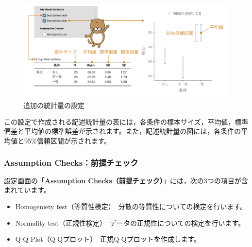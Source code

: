 \documentclass[
  12pt,
  a5jpaper,
  lualatex, ja=standard]{bxjsbook}
\providecommand{\tightlist}{%
  \setlength{\itemsep}{0pt}\setlength{\parskip}{0pt}}
\newenvironment{jmvsettings}{%
	\begin{center}%
	\begin{tcolorbox}[%
		title=設定項目,
		colframe=gmoji,
		colbacktitle=gmoji,
		colback=gmoji!2!white,
		breakable,
		width=.9\textwidth,
		]\small\addtolength{\leftmargini}{-3\labelsep}%
	}%
	{\end{tcolorbox}\end{center}}
\begin{document}
\begin{figure}[!ht]

{\centering \includegraphics[width=1\linewidth]{images/ANOVA/oneway-additional-statistics} 

}

\caption{追加の統計量の設定}\label{fig:ANOVA-oneway-additional-statistics}
\end{figure}

この設定で作成される記述統計量の表には，各条件の標本サイズ，平均値，標準偏差と平均値の標準誤差が示されます。また，記述統計量の図には，各条件の平均値と95\%信頼区間が示されます。

\hypertarget{assumption-checksux524dux63d0ux30c1ux30a7ux30c3ux30af}{%
\subsubsection*{Assumption Checks：前提チェック}\label{assumption-checksux524dux63d0ux30c1ux30a7ux30c3ux30af}}

設定画面の「\textbf{Assumption Checks（前提チェック）}」には，次の3つの項目が含まれています。

\begin{jmvsettings}

\begin{itemize}
\tightlist
\item
  Homogeniety test（等質性検定）　分散の等質性についての検定を行います。
\item
  Normality test（正規性検定）　データの正規性についての検定を行います。
\item
  Q-Q Plot（Q-Qプロット）　正規Q-Qプロットを作成します。
\end{itemize}

\end{jmvsettings}
\end{document}
